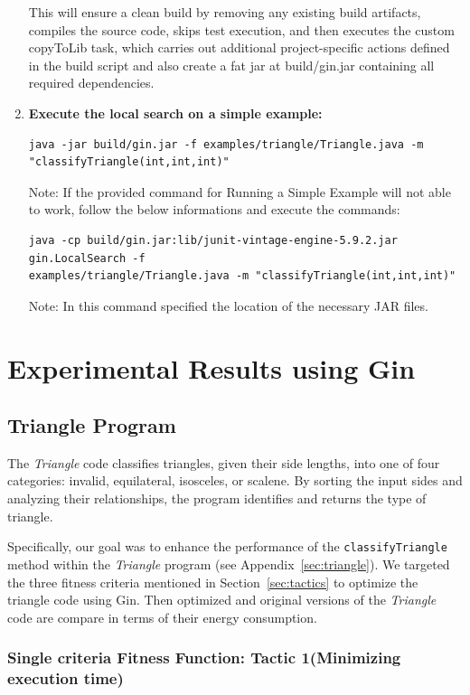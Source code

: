 \begin{enumerate}
This will ensure a clean build by removing any existing build artifacts, compiles the source code, skips test execution, and then executes the custom copyToLib task, which carries out additional project-specific actions defined in the build script and also create a fat jar at build/gin.jar containing all required dependencies.


\item \textbf{Execute the local search on a simple example:}
\begin{verbatim}
java -jar build/gin.jar -f examples/triangle/Triangle.java -m 
"classifyTriangle(int,int,int)"
\end{verbatim}

Note: If the provided command for Running a Simple Example will not able to work, follow the below informations and execute the commands:
\begin{verbatim}
java -cp build/gin.jar:lib/junit-vintage-engine-5.9.2.jar gin.LocalSearch -f
examples/triangle/Triangle.java -m "classifyTriangle(int,int,int)"
\end{verbatim}
Note: In this command specified the location of the necessary JAR files.
\end{enumerate}


\section{Experimental Results using Gin}

\subsection{Triangle Program}
\label{sec:Triangle}
 
The \textit{Triangle} code classifies triangles, given their side lengths, into one of four categories: invalid, equilateral, isosceles, or scalene. By sorting the input sides and analyzing their relationships, the program identifies and returns the type of triangle.

\vspace{.5em}
Specifically, our goal was to enhance the performance of the \texttt{classifyTriangle} method within the \textit{Triangle} program (see Appendix~\ref{sec:triangle}). We targeted the three fitness criteria mentioned in Section~\ref{sec:tactics} to optimize the triangle code using Gin.
Then optimized and original versions of the \textit{Triangle} code are compare in terms of their energy consumption. 


\subsubsection{Single criteria Fitness Function: Tactic 1(Minimizing execution time)}

